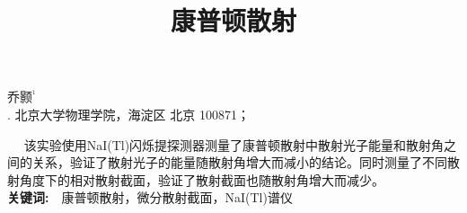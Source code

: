 \documentclass[a4paper,10.0pt,twoside]{npr}
\begin{document}
\setcounter{page}{001}%
\begin{center}
\title{%
\xiaoerhao \bf  %
康普顿散射\\[-5mm]}
\maketitle
\large \fs
乔颢$^{^1}$\\[2mm]

\xiaowu {}. 北京大学物理学院，海淀区 北京 100871；\\[4mm]

 

\parbox{158mm} {
~~\fs
该实验使用NaI(Tl)闪烁提探测器测量了康普顿散射中散射光子能量和散射角之间的关系，验证了散射光子的能量随散射角增大而减小的结论。同时测量了不同散射角度下的相对散射截面，验证了散射截面也随散射角增大而减少。
\\
{\bf 关键词:}~~\fs 康普顿散射，微分散射截面，NaI(Tl)谱仪}\\
\end{center}
\vspace{5mm}
\setcounter{section}{0}
\end{document}
